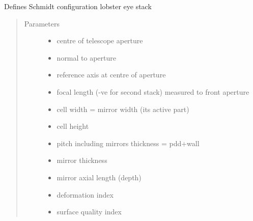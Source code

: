 \documentclass[letterpaper,10pt,english]{sphinxmanual}
\begin{document}
\begin{fulllineitems}
\label{\detokenize{xsrt_functions:xsrt.sle}}
Defines Schmidt configuration lobster eye stack
\begin{quote}\begin{description}
\item[{Parameters}] \leavevmode\begin{itemize}
\item {} 
 \textendash{} centre of telescope aperture

\item {} 
 \textendash{} normal to aperture

\item {} 
 \textendash{} reference axis at centre of aperture

\item {} 
 \textendash{} focal length (-ve for second stack) measured to front aperture

\item {} 
 \textendash{} cell width = mirror width (its active part)

\item {} 
 \textendash{} cell height

\item {} 
 \textendash{} pitch including mirrors thickness = pdd+wall

\item {} 
 \textendash{} mirror thickness

\item {} 
 \textendash{} mirror axial length (depth)

\item {} 
 \textendash{} deformation index

\item {} 
 \textendash{} surface quality index


\end{itemize}
\end{description}
\end{quote}
\end{fulllineitems}
\end{document}
